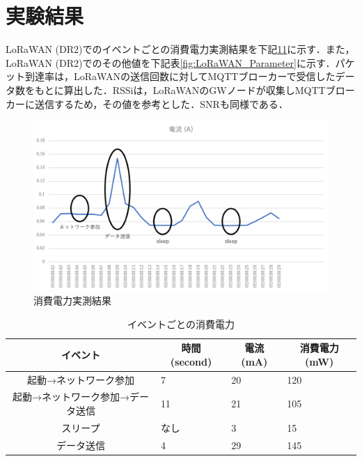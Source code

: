 \section{実験結果}
LoRaWAN (DR2)でのイベントごとの消費電力実測結果を下記\ref{fig:result_power_consumtion}\ref{fig:LoRaWAN_PowerConsumption}に示す．また，LoRaWAN (DR2)でのその他値を下記表\ref{fig:LoRaWAN_Parameter}に示す．パケット到達率は，LoRaWANの送信回数に対してMQTTブローカーで受信したデータ数をもとに算出した．RSSiは，LoRaWANのGWノードが収集しMQTTブローカーに送信するため，その値を参考とした．SNRも同様である．

\begin{figure}[]
    \begin{center}
    \includegraphics[width=15cm]{figures/LoRaWAN_消費電力実験.png}
    \caption{消費電力実測結果}
    \label{fig:result_power_consumtion}
    \end{center}
\end{figure}

\begin{table}[]
    \caption{イベントごとの消費電力}\label{fig:LoRaWAN_PowerConsumption}
    \centering
    \begin{tabular}{|c|l|l|l|}
    \hline
    \textbf{イベント}     & \multicolumn{1}{c|}{\textbf{時間 (second)}} & \multicolumn{1}{c|}{\textbf{電流 (mA)}} & \multicolumn{1}{c|}{\textbf{消費電力 (mW)}} \\ \hline
    起動→ネットワーク参加       & 7                                         & 20                                    & 120                                     \\ \hline
    起動→ネットワーク参加→データ送信 & 11                                        & 21                                    & 105                                     \\ \hline
    スリープ              & なし                                        & 3                                     & 15                                      \\ \hline
    データ送信             & 4                                         & 29                                    & 145                                     \\ \hline
    \end{tabular}
\end{table}

